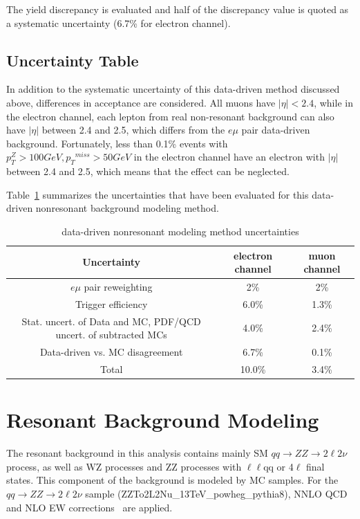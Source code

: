 \vspace{0.3cm}
The yield discrepancy is evaluated and half of the discrepancy value is quoted as a systematic uncertainty (6.7\% for electron channel).

\subsection{Uncertainty Table}
In addition to the systematic uncertainty of this data-driven method discussed above, differences in acceptance are considered. All muons have $|\eta|<2.4$, while in the electron channel, each lepton from real non-resonant background can also have $|\eta|$ between 2.4 and 2.5, which differs from the $e\mu$ pair data-driven background. Fortunately, less than 0.1\% events with $p_{T}^{Z}>100GeV, {p_{T}}^{miss}>50GeV$ in the electron channel have an electron with $|\eta|$ between 2.4 and 2.5, which means that the effect can be neglected. 

\vspace{0.3cm}
Table~\ref{tab:nonresuncert} summarizes the uncertainties that have been evaluated for this data-driven nonresonant background modeling method.
\begin{table}[htbp]
\begin{small}
  \begin{center}
    \caption{
      data-driven nonresonant modeling method uncertainties
      \label{tab:nonresuncert}}
    \begin{tabular}{c|c c}
      \hline\hline
      Uncertainty & electron channel & muon channel \\
      \hline
      $e\mu$ pair reweighting & 2\% & 2\% \\
      Trigger efficiency & 6.0\% & 1.3\% \\
      Stat. uncert. of Data and MC, PDF/QCD uncert. of subtracted MCs  & 4.0\% & 2.4\% \\
      Data-driven vs. MC disagreement & 6.7\% & 0.1\% \\
      \hline
      Total  & 10.0\% & 3.4\% \\
      \hline\hline
    \end{tabular}
  \end{center}
\end{small}
\end{table}

\clearpage
\section{Resonant Background Modeling}
The resonant background in this analysis contains mainly SM $qq\rightarrow ZZ\rightarrow 2\ell 2\nu$ process, as well as WZ processes and ZZ processes with $\ell\ell$qq or 4$\ell$ final states. This component of the background is modeled by MC samples. For the $qq\rightarrow ZZ\rightarrow 2\ell 2\nu$ sample (ZZTo2L2Nu\_13TeV\_powheg\_pythia8), NNLO QCD~\cite{bg_nnloqcd} and NLO EW corrections~\cite{bg_nloqed1,bg_nloqed2} are applied.

